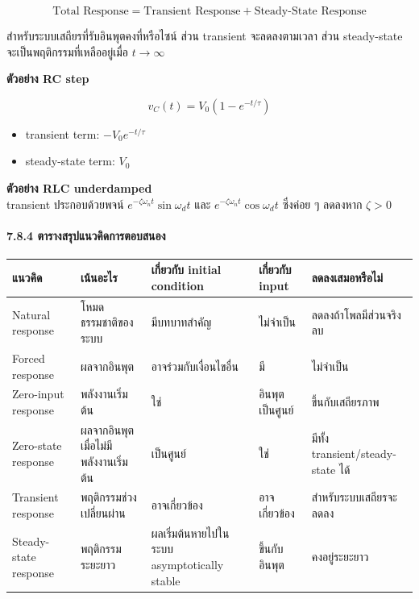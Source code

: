 \[
\text{Total Response}=\text{Transient Response}+\text{Steady-State Response}
\]

สำหรับระบบเสถียรที่รับอินพุตคงที่หรือไซน์ ส่วน transient จะลดลงตามเวลา ส่วน steady-state จะเป็นพฤติกรรมที่เหลืออยู่เมื่อ $t\to\infty$

\textbf{ตัวอย่าง RC step}

\[
v_C(t)=V_0(1-e^{-t/\tau})
\]

\begin{itemize}
    \item transient term: $-V_0e^{-t/\tau}$
    \item steady-state term: $V_0$
\end{itemize}

\textbf{ตัวอย่าง RLC underdamped}\\
transient ประกอบด้วยพจน์ $e^{-\zeta\omega_nt}\sin\omega_dt$ และ $e^{-\zeta\omega_nt}\cos\omega_dt$ ซึ่งค่อย ๆ ลดลงหาก $\zeta>0$

\paragraph{7.8.4 ตารางสรุปแนวคิดการตอบสนอง}

\begin{table}[htbp]
    \centering
    \small
    \setlength{\tabcolsep}{4pt}
    \begin{tabularx}{\textwidth}{L{0.17\textwidth} L{0.18\textwidth} L{0.16\textwidth} L{0.13\textwidth} Y}
        \hline
        \textbf{แนวคิด} & \textbf{เน้นอะไร} & \textbf{เกี่ยวกับ initial condition} & \textbf{เกี่ยวกับ input} & \textbf{ลดลงเสมอหรือไม่} \\
        \hline
        Natural response & โหมดธรรมชาติของระบบ & มีบทบาทสำคัญ & ไม่จำเป็น & ลดลงถ้าโพลมีส่วนจริงลบ \\
        Forced response & ผลจากอินพุต & อาจร่วมกับเงื่อนไขอื่น & มี & ไม่จำเป็น \\
        Zero-input response & พลังงานเริ่มต้น & ใช่ & อินพุตเป็นศูนย์ & ขึ้นกับเสถียรภาพ \\
        Zero-state response & ผลจากอินพุตเมื่อไม่มีพลังงานเริ่มต้น & เป็นศูนย์ & ใช่ & มีทั้ง transient/steady-state ได้ \\
        Transient response & พฤติกรรมช่วงเปลี่ยนผ่าน & อาจเกี่ยวข้อง & อาจเกี่ยวข้อง & สำหรับระบบเสถียรจะลดลง \\
        Steady-state response & พฤติกรรมระยะยาว & ผลเริ่มต้นหายไปในระบบ asymptotically stable & ขึ้นกับอินพุต & คงอยู่ระยะยาว \\
        \hline
    \end{tabularx}
\end{table}

